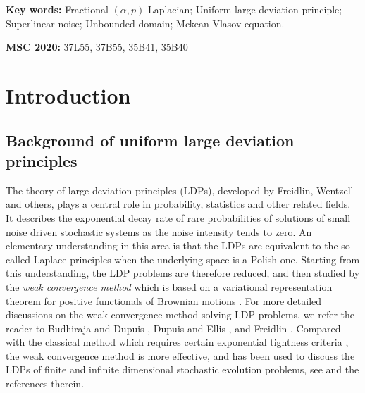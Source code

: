 \documentclass[11pt]{article}
\numberwithin{equation}{section}
\begin{document}
{\bf Key words:} Fractional $(\alpha,p)$-Laplacian; Uniform large deviation principle; Superlinear noise;  Unbounded domain; Mckean-Vlasov equation.

{\bf MSC 2020:} 37L55, 37B55, 35B41, 35B40



\section{Introduction}
\subsection{Background of uniform large
deviation principles}
The theory of large
deviation principles (LDPs), developed by
Freidlin, Wentzell and others, plays a central role in probability,
statistics and other related fields. It describes the exponential
decay rate of rare probabilities of solutions of small noise driven stochastic systems as the noise intensity tends to zero. An elementary understanding in this area is that the LDPs are equivalent to the so-called Laplace principles when the underlying space is a Polish one. Starting from this understanding, the LDP problems are therefore reduced, and then studied by the \emph{weak convergence method} which is based
on a variational representation theorem for positive functionals of Brownian motions \cite{Budhiraja}.
For more detailed discussions on the weak convergence method solving LDP problems, we refer the reader to Budhiraja and Dupuis \cite{Budhiraja}, Dupuis and Ellis
\cite{Dupuis-}, and Freidlin \cite{Freidlin1}.
Compared with the classical method which requires certain exponential tightness criteria \cite{Cerrai1,Chow,Freidlin,Peszat1,Sowers1}, the weak convergence method is more effective, and has been used to discuss the
LDPs of  finite and infinite
dimensional stochastic evolution problems, see \cite{
Brzezniak1,Budhiraja,Budhiraja1,Cerrai2,Chueshov,
LR4,Ren1,Rockner1} and the references therein.
\end{document}
